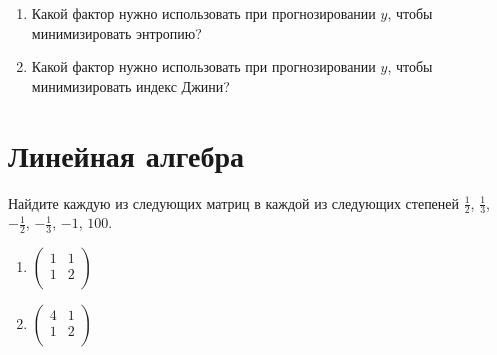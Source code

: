 \documentclass[pdftex,11pt,openany]{book}\usepackage[]{graphicx}\usepackage[]{color}
\begin{document}
\begin{problem}
\begin{enumerate}
\item Какой фактор нужно использовать при прогнозировании $y$, чтобы минимизировать энтропию?
\item Какой фактор нужно использовать при прогнозировании $y$, чтобы минимизировать индекс Джини?
\end{enumerate}
\end{problem}

\begin{solution}
\end{solution}















\chapter{Линейная алгебра}


\begin{problem}
Найдите каждую из следующих матриц в каждой из следующих степеней $\frac{1}{2}$, $\frac{1}{3}$, $-\frac{1}{2}$, $-\frac{1}{3}$, $-1$, $100$.
\begin{enumerate}
\item
\ensuremath{%
\begin{pmatrix}{}
    1 &   1 \\ 
    1 &   2 \\ 
  \end{pmatrix}
}

\item
\ensuremath{%
\begin{pmatrix}{}
    4 &   1 \\ 
    1 &   2 \\ 
  \end{pmatrix}
}

\end{enumerate}
\end{problem}

\begin{solution}
\end{solution}
\end{document}
